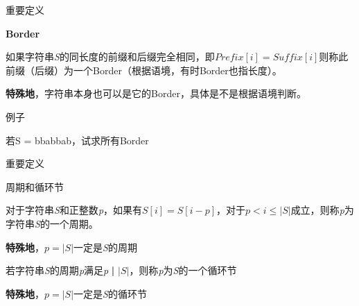 \documentclass{ctexbeamer}		%
\begin{document}
\begin{frame}{重要定义}

\begin{block}{\textbf{Border}}

如果字符串\textit{S}的同长度的前缀和后缀完全相同，即$Prefix[i] = Suffix[i]$则称此前缀（后缀）为一个Border（根据语境，有时Border也指长度）。

\hphantom{ }

\textbf{特殊地}，字符串本身也可以是它的Border，具体是不是根据语境判断。

\end{block}

\pause

\begin{block}{例子}

若S = bbabbab，试求所有Border

\end{block}

\end{frame}

\begin{frame}{重要定义}

\begin{definition}{周期和循环节}

对于字符串\textit{S}和正整数\textit{p}，如果有$S[i] = S[i-p]$，对于$p < i\le |S|$成立，则称\textit{p}为字符串\textit{S}的一个周期。

\hphantom{ }

\textbf{特殊地}，$p = |S|$一定是\textit{S}的周期

\end{definition}

\pause

\begin{definition}

若字符串\textit{S}的周期\textit{p}满足\textit{p} \textbf{|} $|S|$，则称\textit{p}为\textit{S}的一个循环节

\hphantom{ }

\textbf{特殊地}，$p = |S|$一定是\textit{S}的循环节

\end{definition}

\end{frame}
\end{document}
